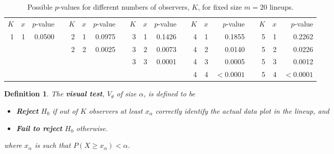 \documentclass{article}
\newcommand{\blue}[1]{{\color{blue} #1}} %
\newcommand{\red}[1]{{\color{red} #1}}
\newtheorem{dfn}{Definition}[section]
\begin{document}
\begin{table}[htp]
\caption{Possible $p$-values for different numbers of observers, $K$, for fixed size $m = 20$ lineups.}
\begin{center}
\begin{tabular}{rrrrrrrrrrrrrrrrrrr}
$K$ &  $x$ & $p$-value && $K$ &  $x$ & $p$-value && $K$ &  $x$ & $p$-value && $K$  & $x$ & $p$-value && $K$  & $x$ & $p$-value\\ \cline{1-3} \cline{5-7}\cline{9-11}\cline{13-15}\cline{17-19}
1 &  1 & 0.0500 && 2 &  1 & 0.0975 && 3 & 1 & 0.1426 && 4 & 1 & 0.1855 && 5 & 1 & 0.2262 \\%
&&&& 2 &  2 & 0.0025 && 3 & 2 & 0.0073 && 4 & 2 & 0.0140 && 5 & 2 & 0.0226 \\
&&&& &&&& 3 & 3 & 0.0001 && 4 & 3 & 0.0005 && 5 & 3 & 0.0012 \\%
&&&&  &    &        &   &   &        &&& 4 & 4 & $< 0.0001$ && 5 & 4 & $< 0.0001$ 
\end{tabular}
\end{center}
\label{pvalue}
\end{table}




\begin{dfn}\label{dfn:test}
The \textbf{visual test}, $V_{\theta}$  of size $\alpha$, is defined to be 
\begin{itemize}\itemsep-3pt
\item \textbf{Reject} $H_0$ if out of $K$ observers at least $x_{\alpha}$ correctly identify the actual data plot in the lineup, and
\item \textbf{Fail to reject} $H_0$  otherwise. 
\end{itemize}
where $x_{\alpha}$ is such that $P(X \ge x_{\alpha}) < \alpha$. 
\end{dfn}
\end{document}
